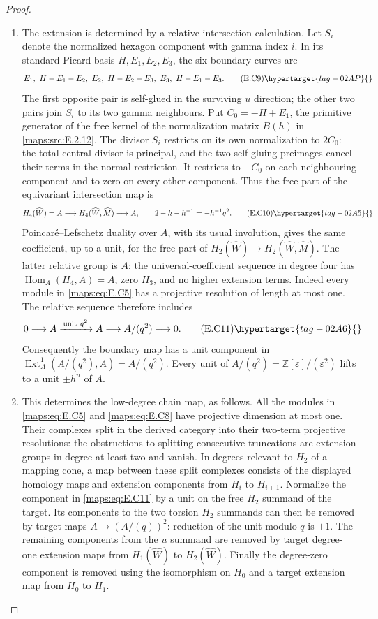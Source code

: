 \begin{proof}
\begin{enumerate}[label={$\langle1\rangle$\arabic*.},leftmargin=*]
\item The extension is determined by a relative intersection calculation. Let $S_i$ denote the normalized hexagon
component with gamma index $i$. In its standard Picard
basis $H,E_1,E_2,E_3$, the six boundary curves are
\[
 E_1,\ H-E_1-E_2,\ E_2,\ H-E_2-E_3,
                       \ E_3,\ H-E_1-E_3.
 \tag{E.C9}\hypertarget{tag-02AP}{}\label{maps:eq:E.C9}
\]
The first opposite pair is self-glued in the surviving
$u$ direction; the other two pairs join $S_i$ to its
two gamma neighbours. Put $C_0=-H+E_1$, the primitive
generator of the free kernel of the normalization matrix
$B(h)$ in \ref{maps:src:E.2.12}. The divisor $S_i$ restricts on its
own normalization to $2C_0$: the total central divisor
is principal, and the two self-gluing preimages cancel
their terms in the normal restriction. It restricts
to $-C_0$ on each neighbouring component and to zero
on every other component. Thus the free part of the
equivariant intersection map is
\[
 H_4(\widehat W)=A\longrightarrow
 H_4(\widehat W,\widehat M)\longrightarrow A,
 \qquad 2-h-h^{-1}=-h^{-1}q^2.
 \tag{E.C10}\hypertarget{tag-02A5}{}\label{maps:eq:E.C10}
\]
Poincar\'e--Lefschetz duality over $A$, with its usual
involution, gives the same coefficient, up to a unit,
for the free part of $H_2(\widehat W)\to
H_2(\widehat W,\widehat M)$. The latter relative group
is $A$: the universal-coefficient sequence in degree
four has $\operatorname{Hom}_A(H_4,A)=A$, zero $H_3$,
and no higher extension terms. Indeed every module
in \eqref{maps:eq:E.C5} has a projective resolution of length at
most one. The relative sequence therefore includes
\[
 0\longrightarrow A\xrightarrow{\,\text{unit}\ q^2\,}A
  \longrightarrow A/(q^2)\longrightarrow0.
 \tag{E.C11}\hypertarget{tag-02A6}{}\label{maps:eq:E.C11}
\]
Consequently the boundary map has a unit component in
$\operatorname{Ext}^1_A(A/(q^2),A)=A/(q^2)$.
Every unit of $A/(q^2)=\mathbb Z[\varepsilon]/(\varepsilon^2)$
lifts to a unit $\pm h^n$ of $A$.

\item This determines the low-degree chain map, as follows. All the
modules in \eqref{maps:eq:E.C5} and \eqref{maps:eq:E.C8} have projective dimension
at most one. Their complexes split in the derived
category into their two-term projective resolutions:
the obstructions to splitting consecutive truncations
are extension groups in degree at least two and vanish.
In degrees relevant to $H_2$ of a mapping cone, a map
between these split complexes consists of the displayed
homology maps and extension components from $H_i$ to
$H_{i+1}$. Normalize the component in \eqref{maps:eq:E.C11} by a unit
on the free $H_2$ summand of the target. Its components
to the two torsion $H_2$ summands can then be removed
by target maps $A\to(A/(q))^2$: reduction of the unit
modulo $q$ is $\pm1$. The remaining components from
the $u$ summand are removed by target degree-one
extension maps from $H_1(\widehat W)$ to
$H_2(\widehat W)$. Finally the degree-zero component
is removed using the isomorphism on $H_0$ and a target
extension map from $H_0$ to $H_1$.


\end{enumerate}
\end{proof}
